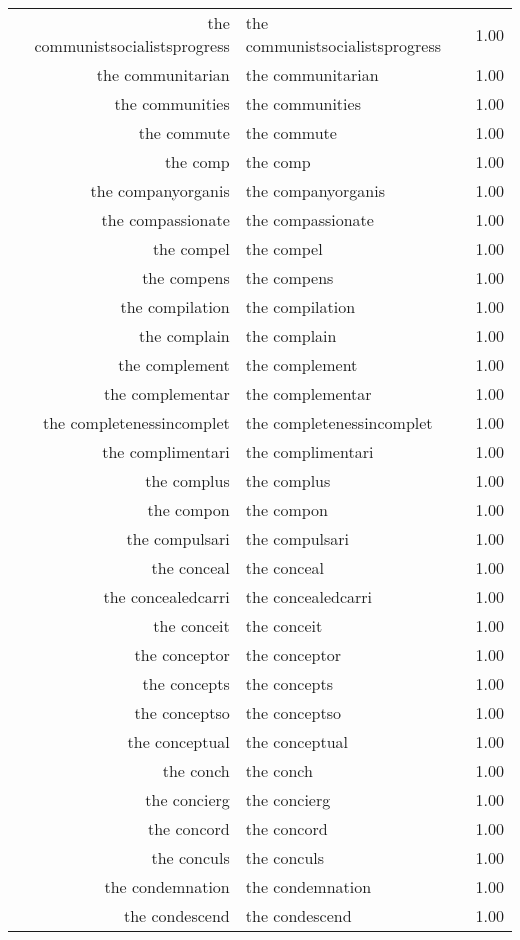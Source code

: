 \begin{table}[ht]
\begin{tabular}{rlr}
  the communistsocialistsprogress & the communistsocialistsprogress & 1.00 \\ 
  the communitarian & the communitarian & 1.00 \\ 
  the communities & the communities & 1.00 \\ 
  the commute & the commute & 1.00 \\ 
  the comp & the comp & 1.00 \\ 
  the companyorganis & the companyorganis & 1.00 \\ 
  the compassionate & the compassionate & 1.00 \\ 
  the compel & the compel & 1.00 \\ 
  the compens & the compens & 1.00 \\ 
  the compilation & the compilation & 1.00 \\ 
  the complain & the complain & 1.00 \\ 
  the complement & the complement & 1.00 \\ 
  the complementar & the complementar & 1.00 \\ 
  the completenessincomplet & the completenessincomplet & 1.00 \\ 
  the complimentari & the complimentari & 1.00 \\ 
  the complus & the complus & 1.00 \\ 
  the compon & the compon & 1.00 \\ 
  the compulsari & the compulsari & 1.00 \\ 
  the conceal & the conceal & 1.00 \\ 
  the concealedcarri & the concealedcarri & 1.00 \\ 
  the conceit & the conceit & 1.00 \\ 
  the conceptor & the conceptor & 1.00 \\ 
  the concepts & the concepts & 1.00 \\ 
  the conceptso & the conceptso & 1.00 \\ 
  the conceptual & the conceptual & 1.00 \\ 
  the conch & the conch & 1.00 \\ 
  the concierg & the concierg & 1.00 \\ 
  the concord & the concord & 1.00 \\ 
  the conculs & the conculs & 1.00 \\ 
  the condemnation & the condemnation & 1.00 \\ 
  the condescend & the condescend & 1.00 \\ 

\end{tabular}
\end{table}
